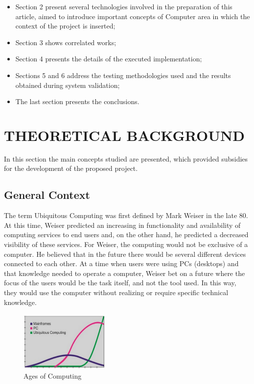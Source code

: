 \documentclass{acm_proc_article-sp}
\begin{document}
\begin{itemize}
\item Section 2 present several technologies involved in the preparation of this article, aimed to introduce important concepts of Computer area in which the context of the project is inserted;
\item Section 3 shows correlated works;
\item Section 4 presents the details of the executed implementation;
\item Sections 5 and 6 address the testing methodologies used and the results obtained during system validation; 
\item The last section presents the conclusions.
\end{itemize}

\section{THEORETICAL BACKGROUND}
In this section the main concepts studied are presented, which provided subsidies for the development of the proposed project.

\subsection{General Context}
The term Ubiquitous Computing was first defined by Mark Weiser \cite{weiser1991} in the late 80. At this time, Weiser predicted an increasing in functionality and availability of computing services to end users and, on the other hand, he predicted a decreased visibility of these services. For Weiser, the computing would not be exclusive of a computer. He believed that in the future there would be several different devices connected to each other. At a time when users were using PCs (desktops) and that knowledge needed to operate a computer,  Weiser bet on a future where the focus of the users would be the task itself, and not the tool used. In this way, they would use the computer without realizing or require specific technical knowledge. \cite{weiser1994world}

\begin{figure}[h]
    \includegraphics[width=0.4\textwidth,natwidth=610,natheight=642]{pictures/era.png}
    \caption{Ages of Computing}
    \label{fig:era}
\end{figure}
\end{document}
